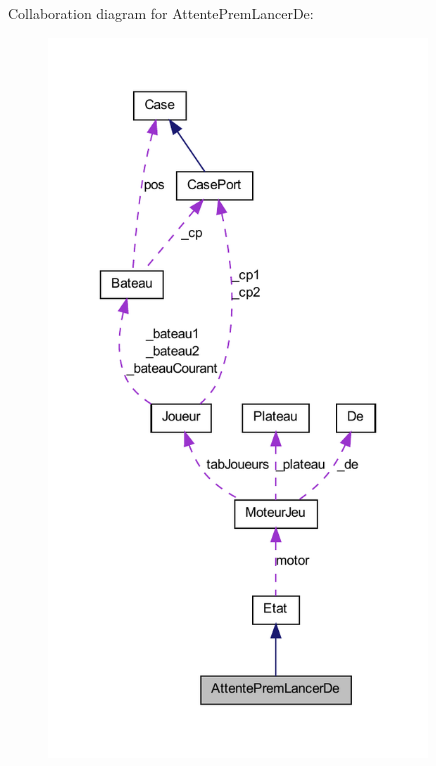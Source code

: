 Collaboration diagram for AttentePremLancerDe:
\nopagebreak
\begin{figure}[H]
\begin{center}
\leavevmode
\includegraphics[width=285pt]{class_attente_prem_lancer_de__coll__graph}
\end{center}
\end{figure}
